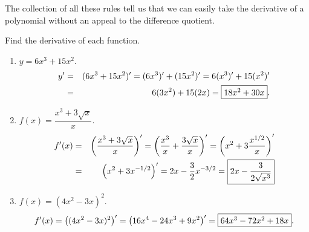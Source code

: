 \documentclass{book}
\begin{document}
The collection of all these rules tell us that we can easily take the derivative of a polynomial without an appeal to the difference quotient. 

\begin{Exam} Find the derivative of each function.
\begin{enumerate}
\item $y= 6x^3 + 15x^2$.
\begin{eqnarray*}y' &=& (6x^3+15x^2)' = (6x^3)'+(15x^2)' = 6(x^3)' + 15(x^2)'\\
 &=& 6(3x^2) + 15(2x) = \fbox{$18x^2 + 30x$}.
 \end{eqnarray*}


\item $f(x) = \dfrac{x^3+3\sqrt{x}}{x}$.
\begin{eqnarray*} f'(x) &=& \left( \dfrac{x^3+3\sqrt{x}}{x}\right)'=  \left(\dfrac{x^3}{x} + \dfrac{3\sqrt{x}}{x}\right)' = \left(x^2 + 3\dfrac{x^{1/2}}{x}\right)'\\ 
&=& \left(x^2 + 3x^{-1/2}\right)' = 2x - \frac{3}{2}x^{-3/2} = \fbox{$2x - \dfrac{3}{2\sqrt{x^{3}}}$}
\end{eqnarray*}

\item $f(x) = (4x^2-3x)^2$.
\[f'(x) = \big((4x^2-3x)^2\big)' = \left(16x^4 -24x^3 + 9x^2\right)' = \fbox{$64x^3 - 72x^2 + 18x$}.\]
\end{enumerate}
\end{Exam}\vs
\end{document}
